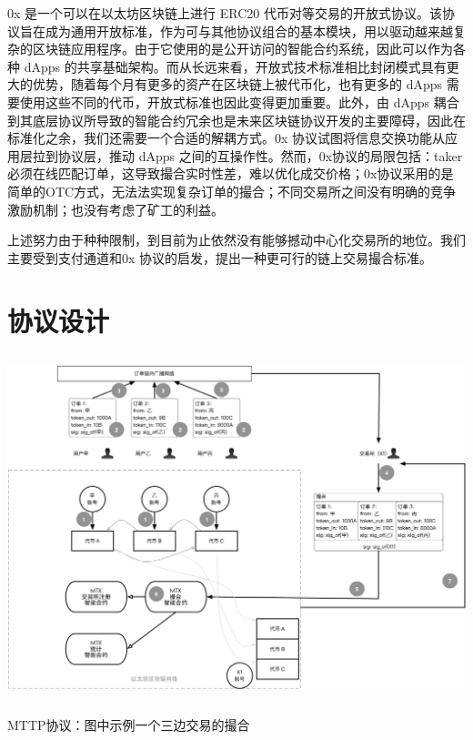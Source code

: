 \documentclass[UTF8,nofonts]{ctexart}
\makeatletter
\newenvironment{figurehere}
  {\def\@captype{figure}}
  {}
\makeatother
\begin{document}
0x \cite{warren20170x} 是一个可以在以太坊区块链上进行 ERC20 代币对等交易的开放式协议。该协议旨在成为通用开放标准，作为可与其他协议组合的基本模块，用以驱动越来越复杂的区块链应用程序。由于它使用的是公开访问的智能合约系统，因此可以作为各种 dApps 的共享基础架构。而从长远来看，开放式技术标准相比封闭模式具有更大的优势，随着每个月有更多的资产在区块链上被代币化，也有更多的 dApps 需要使用这些不同的代币，开放式标准也因此变得更加重要。此外，由 dApps 耦合到其底层协议所导致的智能合约冗余也是未来区块链协议开发的主要障碍，因此在标准化之余，我们还需要一个合适的解耦方式。0x 协议试图将信息交换功能从应用层拉到协议层，推动 dApps 之间的互操作性。然而，0x协议的局限包括：taker必须在线匹配订单，这导致撮合实时性差，难以优化成交价格；0x协议采用的是简单的OTC方式，无法法实现复杂订单的撮合；不同交易所之间没有明确的竞争激励机制；也没有考虑了矿工的利益。

上述努力由于种种限制，到目前为止依然没有能够撼动中心化交易所的地位。我们主要受到支付通道和0x 协议的启发，提出一种更可行的链上交易撮合标准。


\section{协议设计\label{sec:protocol}}

\begin{center}
\begin{figurehere}
\includegraphics[height=10cm]{images/protocol.png}
\caption{MTTP协议：图中示例一个三边交易的撮合}
\label{fig:MTTPprotocol}
\end{figurehere}
\end{center}
\end{document}
